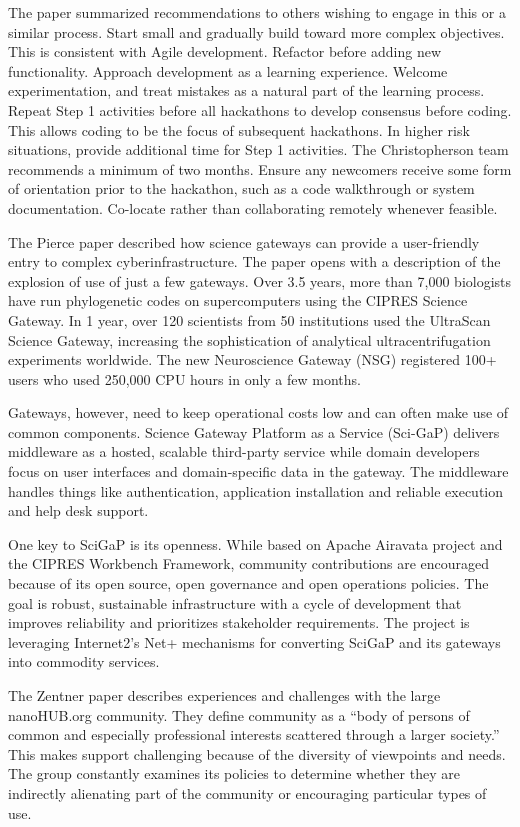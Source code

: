\documentclass[11pt, oneside]{amsart}
\begin{document}
The paper summarized recommendations to others wishing to engage in this or a similar process. Start small and gradually
build toward more complex objectives. This is consistent with Agile development. Refactor before adding new functionality.
Approach development as a learning experience. Welcome experimentation, and treat mistakes as a natural part of the learning process.
Repeat Step 1 activities before all hackathons to develop consensus before coding. This allows coding to be the focus of subsequent hackathons.
In higher risk situations, provide additional time for Step 1 activities. The Christopherson team recommends a minimum of two months.
Ensure any newcomers receive some form of orientation prior to the hackathon, such as a code walkthrough or system documentation.
Co-locate rather than collaborating remotely whenever feasible.

The Pierce paper described how science gateways can provide a user-friendly entry to complex cyberinfrastructure. The paper opens with a description of the explosion of use of just a few gateways.
Over 3.5 years, more than 7,000 biologists have run phylogenetic codes on supercomputers using the CIPRES Science Gateway. In 1 year, over 120 scientists from 50 institutions used the UltraScan Science Gateway,
increasing the sophistication of analytical ultracentrifugation experiments worldwide. The new Neuroscience Gateway (NSG) registered 100+
users who used 250,000 CPU hours in only a few months.

Gateways, however, need to keep operational costs low and can often make use of common components. Science Gateway Platform as a Service (Sci-GaP)
delivers middleware as a hosted, scalable third-party service while domain developers focus on user interfaces and domain-specific data in the gateway.
The middleware handles things like authentication, application installation and reliable execution and help desk support.

One key to SciGaP is its openness. While based on Apache Airavata project and the CIPRES Workbench Framework, community contributions are encouraged because of its open source, open governance and open operations policies.
The goal is robust, sustainable infrastructure with a cycle of development that improves reliability and prioritizes
stakeholder requirements. The project is leveraging Internet2's Net+ mechanisms for converting SciGaP and its gateways into commodity services.

The Zentner paper describes experiences and challenges with the large nanoHUB.org community. They define community as
a ``body of persons of common and especially professional interests scattered through a larger society.'' This makes support
challenging because of the diversity of viewpoints and needs. The group constantly examines its policies to determine
whether they are indirectly alienating part of the community or encouraging particular types of use.
\end{document}
